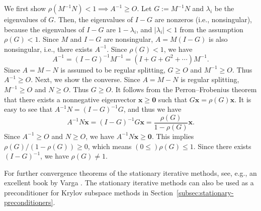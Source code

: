 \begin{Proof}
{We first show $\rho(M^{-1}N)<1\implies A^{-1}\ge O$. Let $G:=M^{-1}N$ and $\lambda_i$ be the eigenvalues of $G$. Then, the eigenvalues of $I-G$ are nonzeros (i.e., nonsingular), because the eigenvalues of $I-G$ are $1-\lambda_i$, and $|\lambda_i|<1$ from the assumption $\rho(G)<1$. Since $M$ and $I-G$ are nonsingular, $A=M(I-G)$ is also nonsingular, i.e., there exists $A^{-1}$. Since $\rho(G)<1$, we have}
\[A^{-1}=(I-G)^{-1}M^{-1}=(I+G+G^2+\cdots)M^{-1}.\]
{Since $A=M-N$ is assumed to be regular splitting, $G\ge O$ and $M^{-1}\ge O$. Thus $A^{-1}\ge O$.}
{Next, we show the converse. Since $A=M-N$ is regular splitting, $M^{-1}\ge O$ and $N\ge O$. Thus $G\ge O$. It follows from the Perron--Frobenius theorem that there exists a nonnegative eigenvector $\bm x\ge\bm0$ such that $G\bm x=\rho(G)\bm x$. It is easy to see that $A^{-1}N=(I-G)^{-1}G$, and thus we have}
\[A^{-1}N\bm x=(I-G)^{-1}G\bm x=\frac{\rho(G)}{1-\rho(G)}\bm x.\]
{Since $A^{-1}\ge O$ and $N\ge O$, we have $A^{-1}N\bm x\ge\bm0$. This implies $\rho(G)/(1-\rho(G))\ge0$, which means $(0\le)\rho(G)\le1$. Since there exists $(I-G)^{-1}$, we have $\rho(G)\ne1$.}
\end{Proof}
{For further convergence theorems of the stationary iterative methods, see, e.g., an excellent book by Varga .}
{The stationary iterative methods can also be used as a preconditioner for Krylov subspace methods in Section~\ref{subsec:stationary-preconditioners}.}
